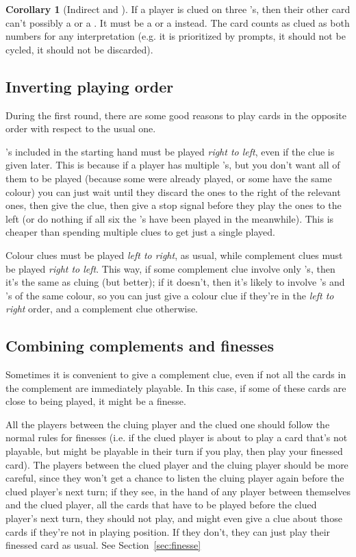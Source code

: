 \documentclass[a4paper]{article}
\theoremstyle{plain}
\theoremstyle{definition}
\newtheorem{corollary}[theorem]{Corollary}
\begin{document}
\begin{corollary}[Indirect  and ]
	\label{indirect25}
	If a player is clued on three 's, then their other card can't possibly a  or a . It must be a  or a  instead. The card counts as clued as both numbers for any interpretation (e.g. it is prioritized by prompts, it should not be cycled, it should not be discarded).
\end{corollary}

\subsection{Inverting playing order}

During the first round, there are some good reasons to play cards in the opposite order with respect to the usual one.

's included in the starting hand must be played \textit{right to left}, even if the clue is given later. This is because if a player has multiple 's, but you don't want all of them to be played (because some were already played, or some have the same colour) you can just wait until they discard the ones to the right of the relevant ones, then give the clue, then give a stop signal before they play the ones to the left (or do nothing if all six the 's have been played in the meanwhile). This is cheaper than spending multiple clues to get just a single  played.

Colour clues must be played \textit{left to right}, as usual, while complement clues must be played \textit{right to left}. This way, if some complement clue involve only 's, then it's the same as cluing  (but better); if it doesn't, then it's likely to involve 's and 's of the same colour, so you can just give a colour clue if they're in the \textit{left to right} order, and a complement clue otherwise.

\subsection{Combining complements and finesses}

Sometimes it is convenient to give a complement clue, even if not all the cards in the complement are immediately playable. In this case, if some of these cards are close to being played, it might be a finesse.

All the players between the cluing player and the clued one should follow the normal rules for finesses (i.e. if the clued player is about to play a card that's not playable, but might be playable in their turn if you play, then play your finessed card). The players between the clued player and the cluing player should be more careful, since they won't get a chance to listen the cluing player again before the clued player's next turn; if they see, in the hand of any player between themselves and the clued player, all the cards that have to be played before the clued player's next turn, they should not play, and might even give a clue about those cards if they're not in playing position. If they don't, they can just play their finessed card as usual. See Section~\ref{sec:finesse}
\end{document}

